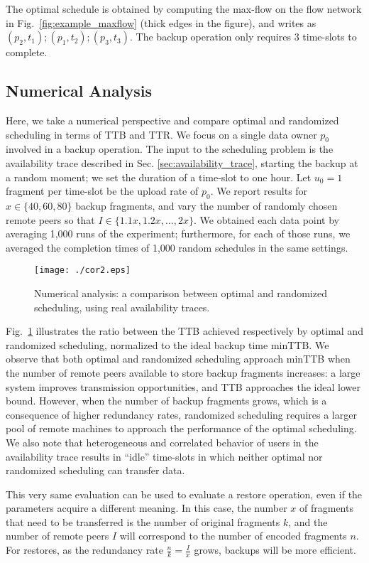 \documentclass[conference,10pt]{IEEEtran}
\begin{document}
The optimal schedule is obtained by computing the max-flow on the flow network in Fig.~\ref{fig:example_maxflow} (thick edges in the figure), and writes as $(p_2,t_1);(p_1,t_2);(p_3,t_3)$. The backup operation only requires 3 time-slots to complete.

\subsection{Numerical Analysis} \label{sec:simple_sim}

Here, we take a numerical perspective and compare optimal
and randomized scheduling in terms of TTB and TTR. We focus on a
single data owner $p_0$ involved in a backup operation.  The input to
the scheduling problem is the availability trace described in
Sec. \ref{sec:availability_trace}, starting the backup at a random
moment; we set the duration of a time-slot to one hour. Let $u_0=1$
fragment per time-slot be the upload rate of $p_0$. We report results
for $x\in\{40, 60, 80\}$ backup fragments, and vary the number of
randomly chosen remote peers so that $I \in
\{1.1x, 1.2x, \ldots, 2x\}$. We obtained each data point by averaging
1,000 runs of the experiment; furthermore, for each of those runs, we
averaged the completion times of 1,000 random schedules in the same
settings.

\begin{figure}
	\centering
	\texttt{[image: ./cor2.eps]} 
	\caption{Numerical analysis: a comparison between optimal and randomized scheduling, using real availability traces.} \label{fig:ineff} 
\end{figure}

Fig.~\ref{fig:ineff} illustrates the ratio between the TTB achieved
respectively by optimal and randomized scheduling, normalized to the
ideal backup time minTTB. We observe that both optimal and randomized
scheduling approach minTTB when the number of remote peers available
to store backup fragments increases: a large system improves
transmission opportunities, and TTB approaches the ideal lower
bound. However, when the number of backup fragments grows, which is a
consequence of higher redundancy rates, randomized scheduling requires
a larger pool of remote machines to approach the performance of the
optimal scheduling. We also note that heterogeneous and correlated
behavior of users in the availability trace results in ``idle''
time-slots in which neither optimal nor randomized scheduling can
transfer data.


This very same evaluation can be used to evaluate a restore operation,
even if the parameters acquire a different meaning. In this case, the
number $x$ of fragments that need to be transferred is the number of
original fragments $k$, and the number of remote peers $I$ will
correspond to the number of encoded fragments $n$. For restores, as
the redundancy rate $\frac n k = \frac I x$ grows, backups will be
more efficient.
\end{document}
